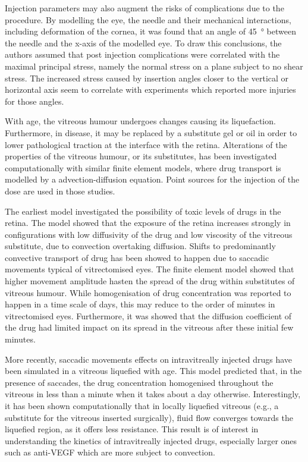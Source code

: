 \documentclass[12pt,a4paper]{journal}
\begin{document}
Injection parameters may also augment the risks of complications due to the procedure.
By modelling the eye, the needle and their mechanical interactions, including deformation of the cornea, it was found that an angle of \SI{45}{\degree} between the needle and the x-axis of the modelled eye.\cite{Karimi_2018}
To draw this conclusions, the authors assumed that post injection complications were correlated with the maximal principal stress, namely the normal stress on a plane subject to no shear stress.  
The increased stress caused by insertion angles closer to the vertical or horizontal axis seem to correlate with experiments which reported more injuries for those angles.\cite{Karimi_2018}

With age, the vitreous humour undergoes changes causing its liquefaction.
Furthermore, in disease, it may be replaced by a substitute gel or oil in order to lower pathological traction at the interface with the retina.
Alterations of the properties of the vitreous humour, or its substitutes, has been investigated computationally with similar finite element models, where drug transport is modelled by a advection-diffusion equation.\cite{Kathawate_2008,Modareszadeh_2012}
Point sources for the injection of the dose are used in those studies.

The earliest model investigated the possibility of toxic levels of drugs in the retina.\cite{Kathawate_2008}
The model showed that the exposure of the retina increases strongly in configurations with low diffusivity of the drug and low viscosity of the vitreous substitute, due to convection overtaking diffusion.\cite{Kathawate_2008}
Shifts to predominantly convective transport of drug has been showed to happen due to saccadic movements typical of vitrectomised eyes.\cite{Modareszadeh_2012}
The finite element model showed that higher movement amplitude hasten the spread of the drug within substitutes of vitreous humour.
While homogenisation of drug concentration was reported to happen in a time scale of days, this may reduce to the order of minutes in vitrectomised eyes.\cite{Modareszadeh_2012}
Furthermore, it was showed that the diffusion coefficient of the drug had limited impact on its spread in the vitreous after these initial few minutes.\cite{Modareszadeh_2012}

More recently, saccadic movements effects on intravitreally injected drugs have been simulated in a vitreous liquefied with age.\cite{Ferroni_2020}
This model predicted that, in the presence of saccades, the drug concentration homogenised throughout the vitreous in less than a minute when it takes about a day otherwise.
Interestingly, it has been shown computationally that in locally liquefied vitreous (e.g., a substitute for the vitreous inserted surgically), fluid flow converges towards the liquefied region, as it offers less resistance.\cite{Khoobyar_2022}
This result is of interest in understanding the kinetics of intravitreally injected drugs, especially larger ones such as anti-VEGF which are more subject to convection.
\end{document}
